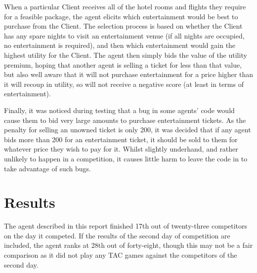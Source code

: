 \documentclass{acm_proc_article-sp}
\begin{document}
  When a particular Client receives all of the hotel rooms and flights they require for a feasible package, the agent elicits which entertainment would be best to purchase from the Client.  The selection process is based on whether the Client has any spare nights to visit an entertainment venue (if all nights are occupied, no entertainment is required), and then which entertainment would gain the highest utility for the Client.  The agent then simply bids the value of the utility premium, hoping that another agent is selling a ticket for less than that value, but also well aware that it will not purchase entertainment for a price higher than it will recoup in utility, so will not receive a negative score (at least in terms of entertainment).
  
  Finally, it was noticed during testing that a bug in some agents' code would cause them to bid very large amounts to purchase entertainment tickets.  As the penalty for selling an unowned ticket is only 200, it was decided that if any agent bids more than 200 for an entertainment ticket, it should be sold to them for whatever price they wish to pay for it.  Whilst slightly underhand, and rather unlikely to happen in a competition, it causes little harm to leave the code in to take advantage of such bugs.

\section{Results}
 \label{res}
 The agent described in this report finished 17th out of twenty-three competitors on the day it competed.  If the results of the second day of competition are included, the agent ranks at 28th out of forty-eight, though this may not be a fair comparison as it did not play any TAC games against the competitors of the second day.
 
\end{document}
